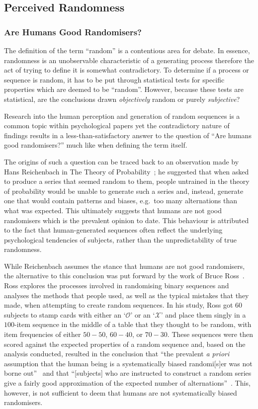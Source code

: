 \subsection{Perceived Randomness}
\subsubsection{Are Humans Good Randomisers?}
The definition of the term ``random'' is a contentious area for debate. In essence, randomness is an unobservable characteristic of a generating process therefore the act of trying to define it is somewhat contradictory. To determine if a process or sequence is random, it has to be put through statistical tests for specific properties which are deemed to be ``random''. However, because these tests are statistical, are the conclusions drawn \textit{objectively} random or purely \textit{subjective}?

Research into the human perception and generation of random sequences is a common topic within psychological papers yet the contradictory nature of findings results in a less-than-satisfactory answer to the question of ``Are humans good randomisers?'' \textendash{} much like when defining the term itself.

The origins of such a question can be traced back to an observation made by Hans Reichenbach in The Theory of Probability~\cite{reichenbach:1949}; he suggested that when asked to produce a series that seemed random to them, people untrained in the theory of probability would be unable to generate such a series and, instead, generate one that would contain patterns and biases, e.g.\ too many alternations than what was expected. This ultimately suggests that humans are not good randomisers which is the prevalent opinion to date. This behaviour is attributed to the fact that human-generated sequences often reflect the underlying psychological tendencies of subjects, rather than the unpredictability of true randomness.

While Reichenbach assumes the stance that humans are not good randomisers, the alternative to this conclusion was put forward by the work of Bruce Ross~\cite{ross:1955}. Ross explores the processes involved in randomising binary sequences and analyses the methods that people used, as well as the typical mistakes that they made, when attempting to create random sequences. In his study, Ross got 60 subjects to stamp cards with either an `$\mathcal{O}$' or an `$\mathcal{X}$' and place them singly in a $100$-item sequence in the middle of a table that they thought to be random, with item frequencies of either $50-50$, $60-40$, or $70-30$. These sequences were then scored against the expected properties of a random sequence and, based on the analysis conducted, resulted in the conclusion that ``the prevalent \textit{a priori} assumption that the human being is a systematically biased randomi[s]er was not borne out''~\cite{ross:1955} and that ``[subjects] who are instructed to construct a random series give a fairly good approximation of the expected number of alternations''~\cite{bakan:1960}. This, however, is not sufficient to deem that humans are not systematically biased randomisers.


